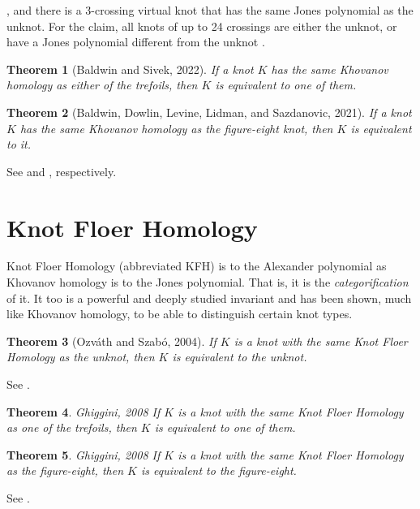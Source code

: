 \documentclass{article}
\theoremstyle{plain}
\newtheorem{theorem}{Theorem}
\begin{document}
        \cite{Thistlethwaite2001LINKSWT}, and there is a 3-crossing virtual
        knot that has the same Jones polynomial as the unknot. For the claim,
        all knots of up to 24 crossings are either the unknot, or have a
        Jones polynomial different from the unknot
        \cite{VerificationUnknotJonesConjUpTo24}.
        \begin{theorem}[Baldwin and Sivek, 2022]
            If a knot $K$ has the same Khovanov homology as either of the
            trefoils, then $K$ is equivalent to one of them.
        \end{theorem}
        \begin{theorem}[Baldwin, Dowlin, Levine, Lidman, and Sazdanovic, 2021]
            If a knot $K$ has the same Khovanov homology as the figure-eight
            knot, then $K$ is equivalent to it.
        \end{theorem}
        See \cite{BaldwinSivekKhovanovTrefoils} and
        \cite{BaldwinDowlinKhovanovFigureEight}, respectively.
    \section{Knot Floer Homology}
        Knot Floer Homology (abbreviated KFH) is to the Alexander polynomial as
        Khovanov homology is to the Jones polynomial. That is, it is the
        \textit{categorification} of it. It too is a powerful and deeply studied
        invariant and has been shown, much like Khovanov homology, to be able to
        distinguish certain knot types.
        \begin{theorem}[Ozv\'{a}th and Szab\'{o}, 2004]
            If $K$ is a knot with the same Knot Floer Homology as the unknot,
            then $K$ is equivalent to the unknot.
        \end{theorem}
        See \cite{Ozsvath04holomorphicdisks}.
        \begin{theorem}{Ghiggini, 2008}
            If $K$ is a knot with the same Knot Floer Homology as one of the
            trefoils, then $K$ is equivalent to one of them.
        \end{theorem}
        \begin{theorem}{Ghiggini, 2008}
            If $K$ is a knot with the same Knot Floer Homology as the
            figure-eight, then $K$ is equivalent to the figure-eight.
        \end{theorem}
        See \cite{Ghiggini08knotfloer}.
\end{document}
